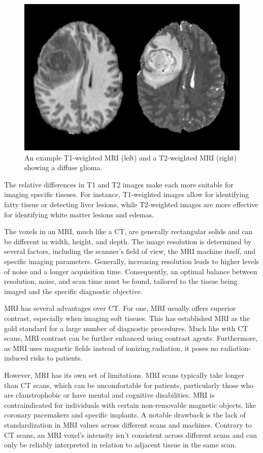 \begin{figure}[!b]
 \centering
 \includegraphics[width=0.65\linewidth]{images/mri-t1-t2-example}
 \caption{An example T1-weighted MRI (left) and a T2-weighted MRI (right) showing a diffuse glioma. \cite{calabreseUniversityCaliforniaSan2022}}
 \label{fig:t1-t2-example}
 \end{figure}
 
 The relative differences in T1 and T2 images make each more suitable for imaging specific tissues. For instance, T1-weighted images allow for identifying fatty tissue or detecting liver lesions, while T2-weighted images are more effective for identifying white matter lesions and edemas.
  
 The voxels in an MRI, much like a CT, are generally rectangular solids and can be different in width, height, and depth. The image resolution is determined by several factors, including the scanner's field of view, the MRI machine itself, and specific imaging parameters. Generally, increasing resolution leads to higher levels of noise and a longer acquisition time. Consequently, an optimal balance between resolution, noise, and scan time must be found, tailored to the tissue being imaged and the specific diagnostic objective.
 
 MRI has several advantages over CT. For one, MRI usually offers superior contrast, especially when imaging soft tissues. This has established MRI as the gold standard for a large number of diagnostic procedures. Much like with CT scans, MRI contrast can be further enhanced using contrast agents. Furthermore, as MRI uses magnetic fields instead of ionizing radiation, it poses no radiation-induced risks to patients.
 
However, MRI has its own set of limitations. MRI scans typically take longer than CT scans, which can be uncomfortable for patients, particularly those who are claustrophobic or have mental and cognitive disabilities. MRI is contraindicated for individuals with certain non-removable magnetic objects, like coronary pacemakers and specific implants. A notable drawback is the lack of standardization in MRI values across different scans and machines. Contrary to CT scans, an MRI voxel's intensity isn't consistent across different scans and can only be reliably interpreted in relation to adjacent tissue in the same scan.

